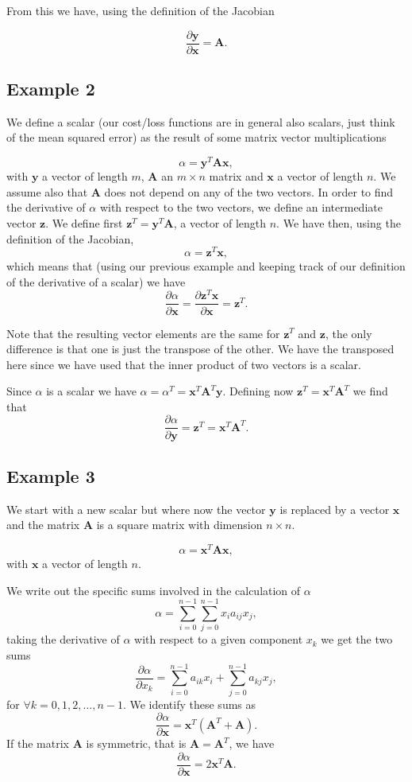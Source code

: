 \documentclass[%
oneside,                 %
final,                   %
10pt]{article}
\begin{document}
From this we have, using the definition of the Jacobian

\[
\frac{\partial \bm{y} }{\partial \bm{x}}= \bm{A}.
\]

\subsection*{Example 2}

We define a scalar (our cost/loss functions are in general also scalars,
just think of the mean squared error) as the result of some matrix vector
multiplications

\[
\alpha = \bm{y}^T\bm{A}\bm{x},
\]
with $\bm{y}$ a vector of length $m$, $\bm{A}$ an $m\times n$ matrix and $\bm{x}$ a vector of length $n$. We assume also that $\bm{A}$ does not depend on any of the two vectors.
In order to find the derivative of $\alpha$ with respect to the two vectors, we define an intermediate vector $\bm{z}$. We define first
$\bm{z}^T=\bm{y}^T\bm{A}$, a vector of length $n$. We have then, using the definition of the Jacobian,
\[
\alpha = \bm{z}^T\bm{x},
\]
which means that (using our previous example and keeping track of our definition of the derivative of a scalar) we have
\[
\frac{\partial \alpha}{\partial \bm{x}} = \frac{\partial \bm{z}^T\bm{x}}{\partial \bm{x}}=\bm{z}^T.
\]

Note that the resulting vector elements are the same for $\bm{z}^T$ and $\bm{z}$, the only difference is that one is just the transpose of the other. We have the transposed here since we have used that the inner product of two vectors is a scalar.

Since $\alpha$ is a scalar we have $\alpha =\alpha^T=\bm{x}^T\bm{A}^T\bm{y}$. Defining now $\bm{z}^T=\bm{x}^T\bm{A}^T$ we find that
\[
\frac{\partial \alpha}{\partial \bm{y}} = \bm{z}^T=\bm{x}^T\bm{A}^T.
\]

\subsection*{Example 3}

We start with a new scalar but where now the vector $\bm{y}$ is
replaced by a vector $\bm{x}$ and the matrix $\bm{A}$ is a square
matrix with dimension $n\times n$.

\[
\alpha = \bm{x}^T\bm{A}\bm{x},
\]
with $\bm{x}$ a vector of length $n$.

We write out the specific sums involved in the calculation of $\alpha$
\[
\alpha = \sum_{i=0}^{n-1}\sum_{j=0}^{n-1}x_i a_{ij}x_j, 
\]
taking the derivative of $\alpha$ with respect to a given component $x_k$ we get the two sums
\[
\frac{\partial \alpha}{\partial x_k}  = \sum_{i=0}^{n-1}a_{ik}x_i+\sum_{j=0}^{n-1}a_{kj}x_j, 
\]
for $\forall k =0,1,2,\dots,n-1$. We identify these sums as
\[
\frac{\partial \alpha}{\partial \bm{x}}  = \bm{x}^T\left(\bm{A}^T+\bm{A}\right).
\]
If the matrix $\bm{A}$ is symmetric, that is $\bm{A}=\bm{A}^T$, we have 
\[
\frac{\partial \alpha}{\partial \bm{x}}  = 2\bm{x}^T\bm{A}.
\]
\end{document}

